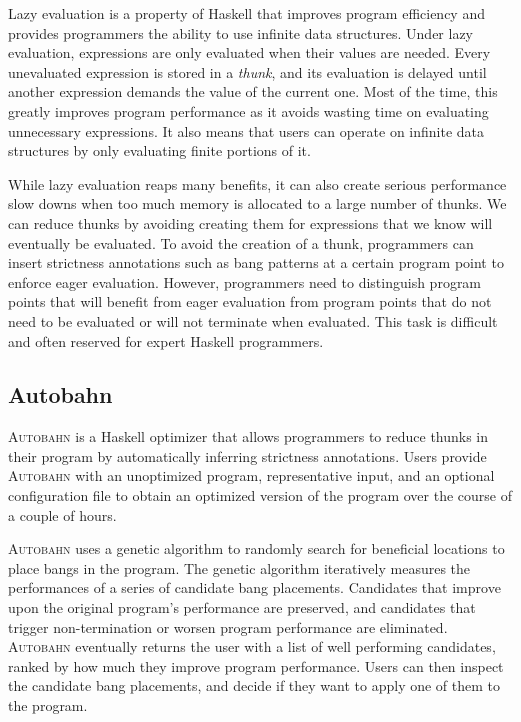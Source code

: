 \documentclass[format=sigplan, review=true]{acmart}
\begin{document}
Lazy evaluation is a property of Haskell that improves program efficiency and provides programmers the ability to use infinite data structures. Under lazy evaluation, expressions are only evaluated when their values are needed. Every unevaluated expression is stored in a \textit{thunk}, and its evaluation is delayed until another expression demands the value of the current one. Most of the time, this greatly improves program performance as it avoids wasting time on evaluating unnecessary expressions. It also means that users can operate on infinite data structures by only evaluating finite portions of it.

While lazy evaluation reaps many benefits, it can also create serious performance slow downs when too much memory is allocated to a large number of thunks. We can reduce thunks by avoiding creating them for expressions that we know will eventually be evaluated. To avoid the creation of a thunk, programmers can insert strictness annotations such as bang patterns at a certain program point to enforce eager evaluation. However, programmers need to distinguish program points that will benefit from eager evaluation from program points that do not need to be evaluated or will not terminate when evaluated. This task is difficult and often reserved for expert Haskell programmers. 

\subsection{Autobahn}

\textsc{Autobahn} is a Haskell optimizer that allows programmers to reduce thunks in their program by automatically inferring strictness annotations. Users provide \textsc{Autobahn} with an unoptimized program, representative input, and an optional configuration file to obtain an optimized version of the program over the course of a couple of hours. 

\textsc{Autobahn} uses a genetic algorithm to randomly search for beneficial locations to place bangs in the program. The genetic algorithm iteratively measures the performances of a series of candidate bang placements. Candidates that improve upon the original program's performance are preserved, and candidates that trigger non-termination or worsen program performance are eliminated. \textsc{Autobahn} eventually returns the user with a list of well performing candidates, ranked by how much they improve program performance. Users can then inspect the candidate bang placements, and decide if they want to apply one of them to the program.
\end{document}
